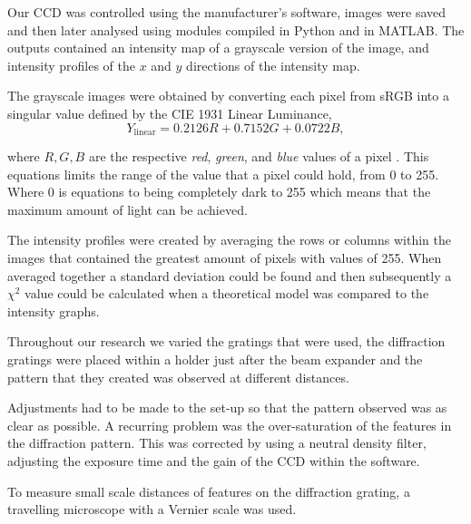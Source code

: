 \documentclass[twocolumn]{revtex4}
\begin{document}
Our CCD was controlled using the manufacturer's software, images were saved and then later analysed using modules compiled in Python and in MATLAB. The outputs contained an intensity map of a grayscale version of the image, and intensity profiles of the $x$ and $y$ directions of the intensity map.  

The grayscale images were obtained by converting each pixel from sRGB into a singular value defined by the CIE 1931 Linear Luminance,
\begin{equation}
Y_{\text{linear}}=0.2126R+0.7152G+0.0722B,
\end{equation}

where $R,G,B$ are the respective \textit{red}, \textit{green}, and \textit{blue} values of a pixel \cite{rgbtogray}. This equations limits the range of the value that a pixel could hold, from 0 to 255. Where 0 is equations to being completely dark to 255 which means that the maximum amount of light can be achieved.

The intensity profiles were created by averaging the rows or columns within the images that contained the greatest amount of pixels with values of 255. When averaged together a standard deviation could be found and then subsequently a $\chi^2$ value could be calculated when a theoretical model was compared to the intensity graphs.

Throughout our research we varied the gratings that were used, the diffraction gratings were placed within a holder just after the beam expander and the pattern that they created was observed at different distances. 

Adjustments had to be made to the set-up so that the pattern observed was as clear as possible. A recurring problem was the over-saturation of the features in the diffraction pattern. This was corrected by using a neutral density filter, adjusting the exposure time and the gain of the CCD within the software.

To measure small scale distances of features on the diffraction grating, a travelling microscope with a Vernier scale was used.

\vspace{-3ex}
\end{document}
